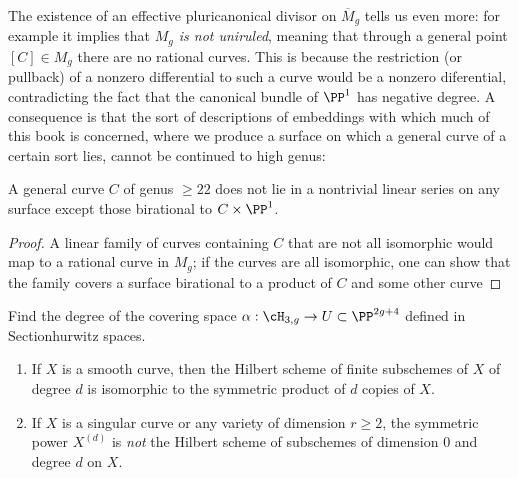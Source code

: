 The existence of an effective pluricanonical divisor on $\overline M_g$ tells us even more: for example it implies that \emph{$M_g$ is not uniruled}, meaning that through a general point $[C] \in M_g$ there are no rational curves. This is because the restriction (or pullback) of a nonzero differential to such a curve would be a nonzero diferential, contradicting the fact that the canonical bundle of $\PP^1$ has  negative degree. A consequence is that the sort of descriptions of embeddings with which much of this book is concerned, where we produce a surface on which a general curve of a certain sort lies, cannot be continued to high genus:

\begin{corollary}
 A general curve $C$ of  genus $\geq 22$ does not lie in a nontrivial linear series on any surface
 except those birational to $C\times \PP^1$.
\end{corollary}
\begin{proof}
 A linear family of curves containing $C$ that are not all isomorphic would map to a rational curve in $M_g$; if the curves are all isomorphic, one can show that the family
 covers a surface birational to a product of $C$ and some other curve 
\end{proof}



\begin{exercise}
Find the degree of the covering space $\alpha : \cH_{3,g} \to U \subset \PP^{2g+4}$
defined in Section{hurwitz spaces}.
\end{exercise}

\begin{exercise}\label{symmetric power vs Hilbert scheme}
\begin{enumerate}
 \item If $X$ is a smooth curve, then the Hilbert scheme of finite subschemes of $X$ of degree $d$ is
 isomorphic to the symmetric product of $d$ copies of $X$.
 \item If $X$ is a singular curve or any variety of dimension $r \geq 2$, the symmetric power $X^{(d)}$ is \emph{not} the Hilbert scheme of subschemes of dimension 0 and degree $d$ on $X$. 
 
\end{enumerate}
 \end{exercise}

